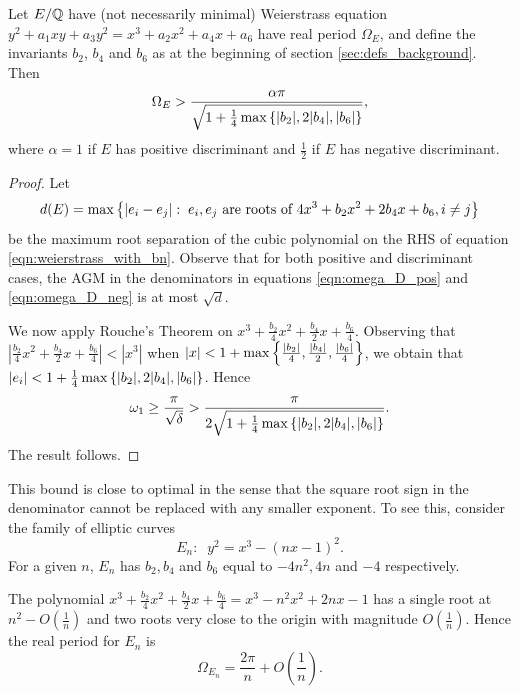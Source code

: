 \documentclass[10pt]{article}
\begin{document}
\begin{lemma}[S.]\label{ineq:Omega_bn_bound}
Let $E/\mathbb{Q}$ have (not necessarily minimal) Weierstrass equation $y^2 + a_1 xy + a_3 y^2 = x^3 + a_2 x^2 + a_4 x + a_6$ have real period $\Omega_E$, and define the invariants $b_2$, $b_4$ and $b_6$ as at the beginning of section \ref{sec:defs_background}. Then
\begin{equation}
\Omega_E > \frac{\alpha \pi}{\sqrt{1+\frac{1}{4}\max\left\{|b_2|,2|b_4|,|b_6|\right\}}},
\end{equation}
where $\alpha = 1$ if $E$ has positive discriminant and $\frac{1}{2}$ if $E$ has negative discriminant.
\end{lemma}
\begin{proof}
Let
\begin{equation}
d(E) = \max\left\{|e_i - e_j|: \; e_i,e_j \text{ are roots of }4x^3 + b_2  x^2 + 2 b_4 x + b_6, i\ne j\right\}
\end{equation}
be the maximum root separation of the cubic polynomial on the RHS of equation \ref{eqn:weierstrass_with_bn}.
Observe that for both positive and discriminant cases, the AGM in the denominators in equations \ref{eqn:omega_D_pos} and \ref{eqn:omega_D_neg} is at most $\sqrt{d}$. 

We now apply Rouche's Theorem on $x^3 + \frac{b_2}{4} x^2 + \frac{b_4}{2} x + \frac{b_6}{4}$. Observing that $|\frac{b_2}{4} x^2 + \frac{b_4}{2} x + \frac{b_6}{4}| < |x^3|$ when $|x| < 1+\max\left\{\frac{|b_2|}{4},\frac{|b_4|}{2},\frac{|b_6|}{4}\right\}$, we obtain that $|e_i| <  1+\frac{1}{4}\max\left\{|b_2|,2|b_4|,|b_6|\right\}$. Hence
\begin{equation*}
\omega_1 \ge \frac{\pi}{\sqrt{\delta}} > \frac{\pi}{2\sqrt{1+\frac{1}{4}\max\left\{|b_2|,2|b_4|,|b_6|\right\}}}.
\end{equation*}
The result follows.
\end{proof}

This bound is close to optimal in the sense that the square root sign in the denominator cannot be replaced with any smaller exponent. To see this, consider the family of elliptic curves
\begin{equation}
E_n: \;\; y^2 = x^3 - (nx-1)^2.
\end{equation}
For a given $n$, $E_n$ has $b_2,b_4$ and $b_6$ equal to $-4n^2,4n$ and $-4$ respectively.

The polynomial $x^3 + \frac{b_2}{4} x^2 + \frac{b_4}{2} x + \frac{b_6}{4} = x^3 -n^2 x^2 + 2n x - 1$ has a single root at $n^2 - O(\frac{1}{n})$ and two roots very close to the origin with magnitude $O(\frac{1}{n})$. Hence the real period for $E_n$ is
\begin{equation}
\Omega_{E_n} = \frac{2\pi}{n} + O\left(\frac{1}{n}\right).
\end{equation}
\end{document}
